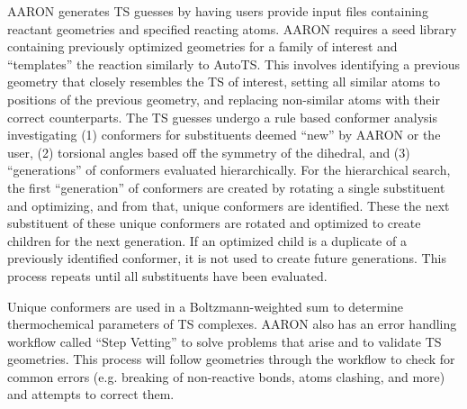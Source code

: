 \documentclass[preprint, 11pt]{elsarticle} %
\begin{document}
AARON generates TS guesses by having users provide input files containing reactant geometries and specified reacting atoms.
AARON requires a seed library containing previously optimized geometries for a family of interest and ``templates'' the reaction similarly to AutoTS.
This involves identifying a previous geometry that closely resembles the TS of interest, setting all similar atoms to positions of the previous geometry, and replacing non-similar atoms with their correct counterparts.
The TS guesses undergo a rule based conformer analysis investigating (1) conformers for substituents  deemed ``new'' by AARON or the user, (2) torsional angles based off the symmetry of the dihedral, and (3) ``generations'' of conformers evaluated hierarchically.
For the hierarchical search, the first ``generation'' of conformers are created by rotating a single substituent and optimizing, and from that, unique conformers are identified.
These the next substituent of these unique conformers are rotated and optimized to create children for the next generation. 
If an optimized child is a duplicate of a previously identified conformer, it is not used to create future generations.
This process repeats until all substituents have been evaluated. 

Unique conformers are used in a Boltzmann-weighted sum to determine thermochemical parameters of TS complexes. 
AARON also has an error handling workflow called ``Step Vetting'' to solve problems that arise and to validate TS geometries.%
This process will follow geometries through the workflow to check for common errors (e.g. breaking of non-reactive bonds, atoms clashing, and more) and attempts to correct them.
\end{document}
